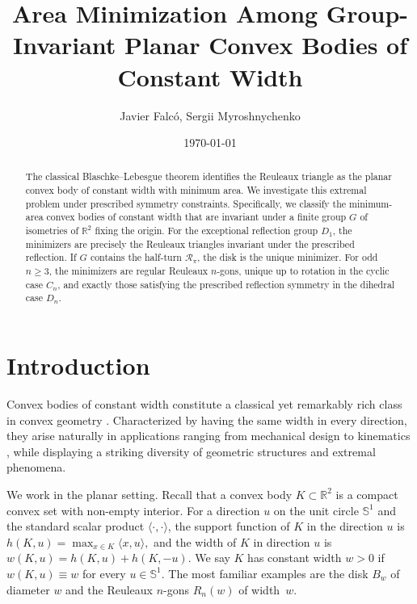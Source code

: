 \documentclass[11pt,letterpaper,reqno]{amsart}
\title{Area Minimization Among Group-Invariant Planar Convex Bodies of Constant Width}
\author[J. Falc\'o, S. Myroshnychenko]{Javier Falc\'o, Sergii Myroshnychenko}
\date{\today}
\newcommand{\R}{\mathbb{R}}
\newcommand{\inner}[2]{\langle #1,#2\rangle}
\providecommand{\R}{\mathbb{R}}
\providecommand{\Sph}{\mathbb{S}}
\providecommand{\supp}{h} %
\providecommand{\width}{w} %
\begin{document}
\begin{abstract}
The classical Blaschke--Lebesgue theorem identifies the Reuleaux triangle as the planar convex body of constant width with minimum area. We investigate this extremal problem under prescribed symmetry constraints. Specifically, we classify the minimum-area convex bodies of constant width that are invariant under a finite group $G$ of isometries of $\mathbb{R}^2$ fixing the origin. For the exceptional reflection group $D_1$, the minimizers are precisely the Reuleaux triangles invariant under the prescribed reflection. If $G$ contains the half-turn $\mathcal R_\pi$, the disk is the unique minimizer. For odd $n\geq 3$, the minimizers are regular Reuleaux $n$-gons, unique up to rotation in the cyclic case $C_n$, and exactly those satisfying the prescribed reflection symmetry in the dihedral case $D_n$.
\end{abstract}

\maketitle



\section{Introduction}
Convex bodies of constant width constitute a classical yet remarkably rich class in convex geometry \cite{Martini2019}. Characterized by having the same width in every direction, they arise naturally in applications ranging from mechanical design \cite{ZCJ} to kinematics \cite{Reuleaux}, while displaying a striking diversity of geometric structures and extremal phenomena.


We work in the planar setting. Recall that a convex body \(K \subset \R^2\) is a compact convex set with non-empty interior. For a direction $u$ on the unit circle \(\Sph^1\) and the standard scalar product $\inner{\cdot}{\cdot}$, the support function of $K$ in the direction $u$ is
$
\supp(K,u)=\max_{x \in K}\inner{x}{u},
$
and the width of \(K\) in direction \(u\) is
$
\width(K,u)=\supp(K,u)+\supp(K,-u).
$
We say \(K\) has constant width \(w>0\) if \(\width(K,u)\equiv w\) for every \(u\in\Sph^1\). The most familiar examples are the disk $B_w$ of diameter \(w\) and the Reuleaux $n$-gons $R_n(w)$ of width~\(w\).
\end{document}
